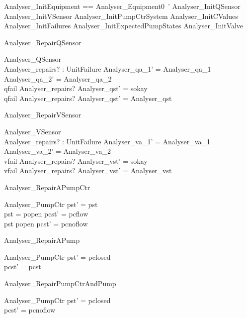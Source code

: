 \documentclass{article}
\begin{document}
\begin{zed}
	Analyser\_InitEquipment == Analyser\_Equipment0~' \land Analyser\_InitQSensor \land Analyser\_InitVSensor \land Analyser\_InitPumpCtrSystem \land Analyser\_InitCValues \land Analyser\_InitFailures \land Analyser\_InitExpectedPumpStates \land Analyser\_InitValve
\end{zed}

\begin{schema}{Analyser\_RepairQSensor}

 \Delta Analyser\_QSensor \\
 Analyser\_repairs? : \power UnitFailure 
\where
 Analyser\_qa\_1' = Analyser\_qa\_1 \\
 Analyser\_qa\_2' = Analyser\_qa\_2 \\
 qfail \in Analyser\_repairs? \implies Analyser\_qst' = sokay \\
 qfail \notin Analyser\_repairs? \implies Analyser\_qst' = Analyser\_qst
\end{schema}

\begin{schema}{Analyser\_RepairVSensor}

 \Delta Analyser\_VSensor \\
 Analyser\_repairs? : \power UnitFailure 
\where
 Analyser\_va\_1' = Analyser\_va\_1 \\
 Analyser\_va\_2' = Analyser\_va\_2 \\
 vfail \in Analyser\_repairs? \implies Analyser\_vst' = sokay \\
 vfail \notin Analyser\_repairs? \implies Analyser\_vst' = Analyser\_vst
\end{schema}

\begin{schema}{Analyser\_RepairAPumpCtr}

 \Delta Analyser\_PumpCtr 
\where
 pst' = pst \\
 pst = popen \implies pcst' = pcflow \\
 pst \neq popen \implies pcst' = pcnoflow
\end{schema}

\begin{schema}{Analyser\_RepairAPump}

 \Delta Analyser\_PumpCtr 
\where
 pst' = pclosed \\
 pcst' = pcst
\end{schema}

\begin{schema}{Analyser\_RepairPumpCtrAndPump}

 \Delta Analyser\_PumpCtr 
\where
 pst' = pclosed \\
 pcst' = pcnoflow
\end{schema}
\end{document}
